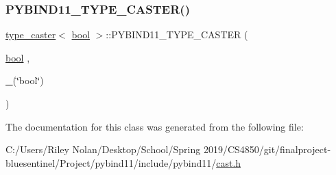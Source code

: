 \subsubsection{\texorpdfstring{PYBIND11\_TYPE\_CASTER()}{PYBIND11\_TYPE\_CASTER()}}
{\footnotesize\ttfamily \mbox{\hyperlink{classtype__caster}{type\+\_\+caster}}$<$ \mbox{\hyperlink{asdl_8h_af6a258d8f3ee5206d682d799316314b1}{bool}} $>$\+::P\+Y\+B\+I\+N\+D11\+\_\+\+T\+Y\+P\+E\+\_\+\+C\+A\+S\+T\+ER (\begin{DoxyParamCaption}\item[{\mbox{\hyperlink{asdl_8h_af6a258d8f3ee5206d682d799316314b1}{bool}}}]{,  }\item[{\mbox{\hyperlink{descr_8h_af114703e20c6527e87163eb2798f74b8}{\+\_\+}}(\char`\"{}bool\char`\"{})}]{ }\end{DoxyParamCaption})}



The documentation for this class was generated from the following file\+:\begin{DoxyCompactItemize}
\item 
C\+:/\+Users/\+Riley Nolan/\+Desktop/\+School/\+Spring 2019/\+C\+S4850/git/finalproject-\/bluesentinel/\+Project/pybind11/include/pybind11/\mbox{\hyperlink{cast_8h}{cast.\+h}}\end{DoxyCompactItemize}
